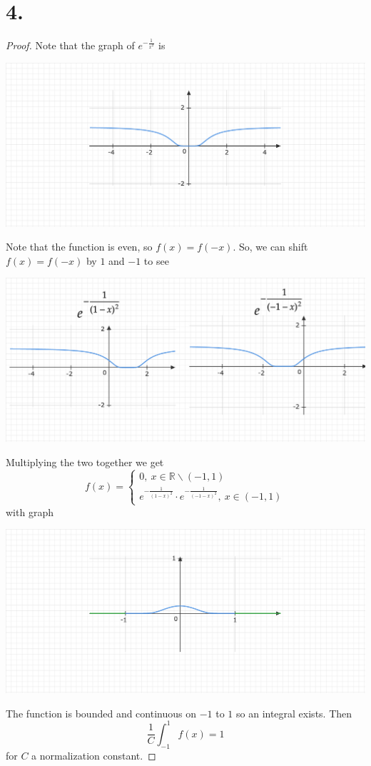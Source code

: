 \documentclass{article}
\begin{document}
\section*{4.}
\begin{proof}
  Note that the graph of $e^{-\frac{1}{x^2}}$ is 
\begin{center}
    \includegraphics[scale = 0.25]{diagram-20240422 (1).png}
\end{center}
Note that the function is even, so $f(x) = f(-x)$. So, we can shift $f(x) = f(-x)$ by $1$ and $-1$ to see
\begin{center}
\includegraphics[scale = 0.25]{diagram-20240422.png}
\end{center}
Multiplying the two together we get 
\[
 f(x) = \begin{cases}
  0 , \ x \in \mathbb{R}\backslash(-1, 1)\\
  e^{-\frac{1}{(1 - x)^2}} \cdot e^{-\frac{1}{(-1 - x)^2}}, \ x\in (-1, 1)
 \end{cases} 
\]
with graph 
\begin{center}
  \includegraphics[scale = 0.25]{diagram-20240422 (2).png}
\end{center}
The function is bounded and continuous on $-1$ to $1$ so an integral exists. Then \[
 \frac{1}{C}\int_{-1}^1f(x) = 1 
\]
for $C$ a normalization constant. 
\end{proof}
\end{document}
